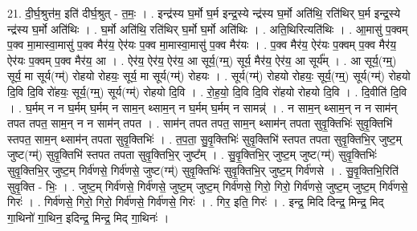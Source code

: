 \documentclass[17pt]{extarticle}
\begin{document}
21. दी॒र्घ॒श्रुत्त॑म॒ इति॑ दीर्घ॒श्रुत् - त॒मः॒ । . इन्द्र॑स्य घ॒र्मो घ॒र्म इन्द्र॒स्ये न्द्र॑स्य घ॒र्मो अति॑थि॒ रति॑थिर् घ॒र्म इन्द्र॒स्ये न्द्र॑स्य घ॒र्मो अति॑थिः । . घ॒र्मो अति॑थि॒ रति॑थिर् घ॒र्मो घ॒र्मो अति॑थिः । . अति॒थिरित्यति॑थिः । . आ॒मासु॑ प॒क्वम् प॒क्व मा॒मास्वा॒मासु॑ प॒क्व मैर॑य॒ ऐर॑यः प॒क्व मा॒मास्वा॒मासु॑ प॒क्व मैर॑यः । . प॒क्व मैर॑य॒ ऐर॑यः प॒क्वम् प॒क्व मैर॑य॒ ऐर॑यः प॒क्वम् प॒क्व मैर॑य॒ आ । . ऐर॑य॒ ऐर॑य॒ ऐर॑य॒ आ सूर्य॒(ग्म्॒) सूर्य॒ मैर॑य॒ ऐर॑य॒ आ सूर्य᳚म् । . आ सूर्य॒(ग्म्॒) सूर्य॒ मा सूर्य(ग्म्॑) रोहयो रोहयः॒ सूर्य॒ मा सूर्य(ग्म्॑) रोहयः । . सूर्य(ग्म्॑) रोहयो रोहयः॒ सूर्य॒(ग्म्॒) सूर्य(ग्म्॑) रोहयो दि॒वि दि॒वि रो॑हयः॒ सूर्य॒(ग्म्॒) सूर्य(ग्म्॑) रोहयो दि॒वि । . रो॒ह॒यो॒ दि॒वि दि॒वि रो॑हयो रोहयो दि॒वि । . दि॒वीति॑ दि॒वि । . घ॒र्मम् न न घ॒र्मम् घ॒र्मम् न साम॒न् थ्साम॒न् न घ॒र्मम् घ॒र्मम् न सामन्न्॑ । . न साम॒न् थ्साम॒न् न न साम॑न् तपत तपत॒ साम॒न् न न साम॑न् तपत । . साम॑न् तपत तपत॒ साम॒न् थ्साम॑न् तपता सुवृ॒क्तिभिः॑ सुवृ॒क्तिभि॑ स्तपत॒ साम॒न् थ्साम॑न् तपता सुवृ॒क्तिभिः॑ । . त॒प॒ता॒ सु॒वृ॒क्तिभिः॑ सुवृ॒क्तिभि॑ स्तपत तपता सुवृ॒क्तिभि॒र् जुष्ट॒म् जुष्ट(ग्म्॑) सुवृ॒क्तिभि॑ स्तपत तपता सुवृ॒क्तिभि॒र् जुष्ट᳚म् । . सु॒वृ॒क्तिभि॒र् जुष्ट॒म् जुष्ट(ग्म्॑) सुवृ॒क्तिभिः॑ सुवृ॒क्तिभि॒र् जुष्ट॒म् गिर्व॑णसे॒ गिर्व॑णसे॒ जुष्ट(ग्म्॑) सुवृ॒क्तिभिः॑ सुवृ॒क्तिभि॒र् जुष्ट॒म् गिर्व॑णसे । . सु॒वृ॒क्तिभि॒रिति॑ सुवृ॒क्ति - भिः॒ । . जुष्ट॒म् गिर्व॑णसे॒ गिर्व॑णसे॒ जुष्ट॒म् जुष्ट॒म् गिर्व॑णसे॒ गिरो॒ गिरो॒ गिर्व॑णसे॒ जुष्ट॒म् जुष्ट॒म् गिर्व॑णसे॒ गिरः॑ । . गिर्व॑णसे॒ गिरो॒ गिरो॒ गिर्व॑णसे॒ गिर्व॑णसे॒ गिरः॑ । . गिर॒ इति॒ गिरः॑ । . इन्द्र॒ मिदि दिन्द्र॒ मिन्द्र॒ मिद् गा॒थिनो॑ गा॒थिन॒ इदिन्द्र॒ मिन्द्र॒ मिद् गा॒थिनः॑ । \newline
\end{document}
